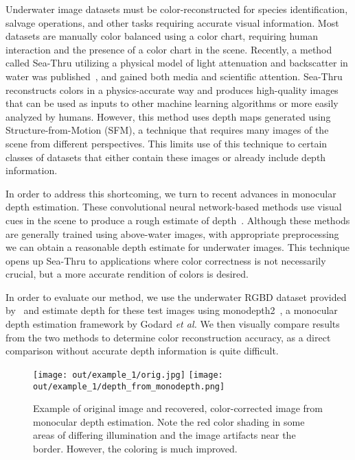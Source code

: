 \documentclass[10pt,twocolumn,letterpaper]{article}
\begin{document}
Underwater image datasets must be color-reconstructed for species identification, salvage operations, and
other tasks requiring accurate visual information. Most datasets are manually color balanced using a color
chart, requiring human interaction and the presence of a color chart in the scene. Recently, a method called
Sea-Thru utilizing a physical model of light attenuation and backscatter in water was published~\cite{seathru},
and gained both media and scientific attention. Sea-Thru reconstructs colors in a physics-accurate way and
produces high-quality images that can be used as inputs to other machine learning algorithms or more easily
analyzed by humans. However, this method uses depth maps generated using Structure-from-Motion (SFM), a technique
that requires many images of the scene from different perspectives. This limits use of this technique to certain
classes of datasets that either contain these images or already include depth information.

In order to address this shortcoming, we turn to recent advances in monocular depth estimation. These convolutional
neural network-based methods use visual cues in the scene to produce a rough estimate of depth~\cite{bhoi2019monocular}.
Although these methods are generally trained using above-water images, with appropriate preprocessing we can obtain
a reasonable depth estimate for underwater images. This technique opens up Sea-Thru to applications where color
correctness is not necessarily crucial, but a more accurate rendition of colors is desired.

In order to evaluate our method, we use the underwater RGBD dataset provided by~\cite{seathru} and estimate depth
for these test images using monodepth2~\cite{monodepth2}, a monocular depth estimation framework by Godard
\textit{et al.} We then visually compare results from the two methods to determine color reconstruction accuracy,
as a direct comparison without accurate depth information is quite difficult.

\begin{figure}[!t]
\begin{center}
\texttt{[image: out/example\_1/orig.jpg]}\newline
\texttt{[image: out/example\_1/depth\_from\_monodepth.png]}
\end{center}
   \caption{\small{Example of original image and recovered, color-corrected image from monocular depth estimation. Note
   the red color shading in some areas of differing illumination and the image artifacts near the border. However, the
   coloring is much improved.}}
\label{fig:exampleout}
\end{figure}
\end{document}
